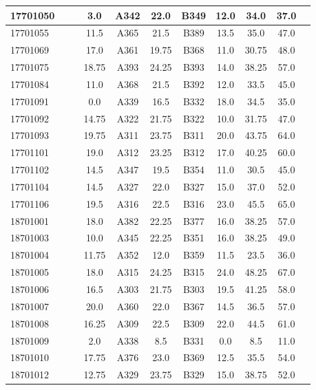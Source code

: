 \documentclass[12pt]{article}
\begin{document}
\begin{center}
\begin{small}
\begin{tabular}{|l|c|c|c|c|c|c|c|c|c|c|}
17701050 &  &  & 3.0 & A342 & 22.0 & B349 & 12.0 & 34.0 & 37.0\\ \hline 
17701055 &  &  & 11.5 & A365 & 21.5 & B389 & 13.5 & 35.0 & 47.0\\ \hline 
17701069 &  &  & 17.0 & A361 & 19.75 & B368 & 11.0 & 30.75 & 48.0\\ \hline 
17701075 &  &  & 18.75 & A393 & 24.25 & B393 & 14.0 & 38.25 & 57.0\\ \hline 
17701084 &  &  & 11.0 & A368 & 21.5 & B392 & 12.0 & 33.5 & 45.0\\ \hline 
17701091 &  &  & 0.0 & A339 & 16.5 & B332 & 18.0 & 34.5 & 35.0\\ \hline 
17701092 &  &  & 14.75 & A322 & 21.75 & B322 & 10.0 & 31.75 & 47.0\\ \hline 
17701093 &  &  & 19.75 & A311 & 23.75 & B311 & 20.0 & 43.75 & 64.0\\ \hline 
17701101 &  &  & 19.0 & A312 & 23.25 & B312 & 17.0 & 40.25 & 60.0\\ \hline 
17701102 &  &  & 14.5 & A347 & 19.5 & B354 & 11.0 & 30.5 & 45.0\\ \hline 
17701104 &  &  & 14.5 & A327 & 22.0 & B327 & 15.0 & 37.0 & 52.0\\ \hline 
17701106 &  &  & 19.5 & A316 & 22.5 & B316 & 23.0 & 45.5 & 65.0\\ \hline 
18701001 &  &  & 18.0 & A382 & 22.25 & B377 & 16.0 & 38.25 & 57.0\\ \hline 
18701003 &  &  & 10.0 & A345 & 22.25 & B351 & 16.0 & 38.25 & 49.0\\ \hline 
18701004 &  &  & 11.75 & A352 & 12.0 & B359 & 11.5 & 23.5 & 36.0\\ \hline 
18701005 &  &  & 18.0 & A315 & 24.25 & B315 & 24.0 & 48.25 & 67.0\\ \hline 
18701006 &  &  & 16.5 & A303 & 21.75 & B303 & 19.5 & 41.25 & 58.0\\ \hline 
18701007 &  &  & 20.0 & A360 & 22.0 & B367 & 14.5 & 36.5 & 57.0\\ \hline 
18701008 &  &  & 16.25 & A309 & 22.5 & B309 & 22.0 & 44.5 & 61.0\\ \hline 
18701009 &  &  & 2.0 & A338 & 8.5 & B331 & 0.0 & 8.5 & 11.0\\ \hline 
18701010 &  &  & 17.75 & A376 & 23.0 & B369 & 12.5 & 35.5 & 54.0\\ \hline 
18701012 &  &  & 12.75 & A329 & 23.75 & B329 & 15.0 & 38.75 & 52.0\\ \hline 
        \end{tabular}
            \end{small}
            \end{center}
  \centering
            
\end{document}
